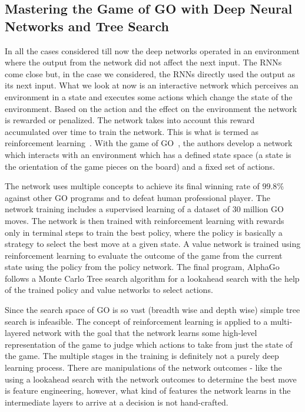 \documentclass[10pt]{article}
\begin{document}
\subsection{Mastering the Game of GO with Deep Neural Networks and Tree Search}
\par In all the cases considered till now the deep networks operated in an environment where the output from the network did not affect the next input. The RNNs come close but, in the case we considered, the RNNs directly used the output as its next input. What we look at now is an interactive network which perceives an environment in a state and executes some actions which change the state of the environment. Based on the action and the effect on the environment the network is rewarded or penalized. The network takes into account this reward accumulated over time to train the network. This is what is termed as reinforcement learning~\cite{karpathy2016deep}. With the game of GO~\cite{silver2016mastering}, the authors develop a network which interacts with an environment which has a defined state space (a state is the orientation of the game pieces on the board) and a fixed set of actions.
\par The network uses multiple concepts to achieve its final winning rate of $99.8\%$ against other GO programs and to defeat human professional player. The network training includes a supervised learning of a dataset of 30 million GO moves. The network is then trained with reinforcement learning with rewards only in terminal steps to train the best policy, where the policy is basically a strategy to select the best move at a given state. A value network is trained using reinforcement learning to evaluate the outcome of the game from the current state using the policy from the policy network. The final program, AlphaGo follows a Monte Carlo Tree search algorithm for a lookahead search with the help of the trained policy and value networks to select actions.
\par Since the search space of GO is so vast (breadth wise and depth wise) simple tree search is infeasible. The concept of reinforcement learning is applied to a multi-layered network with the goal that the network learns some high-level representation of the game to judge which actions to take from just the state of the game. The multiple stages in the training is definitely not a purely deep learning process. There are manipulations of the network outcomes - like the using a lookahead search with the network outcomes to determine the best move is feature engineering, however, what kind of features the network learns in the intermediate layers to arrive at a decision is not hand-crafted.   
\end{document}
